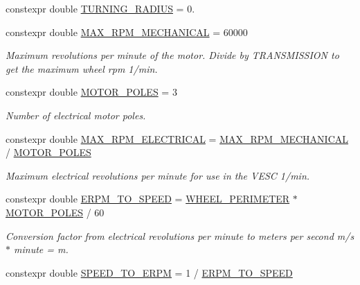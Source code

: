 \begin{DoxyCompactItemize}
\item 
constexpr double \hyperlink{namespacecar__config_afe308ba7ae07f7bd5af7e79a095101a9}{T\+U\+R\+N\+I\+N\+G\+\_\+\+R\+A\+D\+I\+US} = 0.
\item 
constexpr double \hyperlink{namespacecar__config_ad35069a183782259c6280aa219b72ffa}{M\+A\+X\+\_\+\+R\+P\+M\+\_\+\+M\+E\+C\+H\+A\+N\+I\+C\+AL} = 60000
\begin{DoxyCompactList}\small\item\em Maximum revolutions per minute of the motor. Divide by T\+R\+A\+N\+S\+M\+I\+S\+S\+I\+ON to get the maximum wheel rpm  1/min. \end{DoxyCompactList}\item 
constexpr double \hyperlink{namespacecar__config_a611a0f02cf52db1d438a2dd53b642cd5}{M\+O\+T\+O\+R\+\_\+\+P\+O\+L\+ES} = 3
\begin{DoxyCompactList}\small\item\em Number of electrical motor poles. \end{DoxyCompactList}\item 
constexpr double \hyperlink{namespacecar__config_aaf4d6a90e2b9c983b0b0d29a584c399b}{M\+A\+X\+\_\+\+R\+P\+M\+\_\+\+E\+L\+E\+C\+T\+R\+I\+C\+AL} = \hyperlink{namespacecar__config_ad35069a183782259c6280aa219b72ffa}{M\+A\+X\+\_\+\+R\+P\+M\+\_\+\+M\+E\+C\+H\+A\+N\+I\+C\+AL} / \hyperlink{namespacecar__config_a611a0f02cf52db1d438a2dd53b642cd5}{M\+O\+T\+O\+R\+\_\+\+P\+O\+L\+ES}
\begin{DoxyCompactList}\small\item\em Maximum electrical revolutions per minute for use in the V\+E\+SC  1/min. \end{DoxyCompactList}\item 
constexpr double \hyperlink{namespacecar__config_af33b95798967e7193927782fd91d36ce}{E\+R\+P\+M\+\_\+\+T\+O\+\_\+\+S\+P\+E\+ED} = \hyperlink{namespacecar__config_a46fe00906da07d2e030b586a634cd907}{W\+H\+E\+E\+L\+\_\+\+P\+E\+R\+I\+M\+E\+T\+ER} $\ast$ \hyperlink{namespacecar__config_a611a0f02cf52db1d438a2dd53b642cd5}{M\+O\+T\+O\+R\+\_\+\+P\+O\+L\+ES} / 60
\begin{DoxyCompactList}\small\item\em Conversion factor from electrical revolutions per minute to meters per second  m/s $\ast$ minute = m. \end{DoxyCompactList}\item 
constexpr double \hyperlink{namespacecar__config_a0f37aa7e52366aebb006c6e1d3317900}{S\+P\+E\+E\+D\+\_\+\+T\+O\+\_\+\+E\+R\+PM} = 1 / \hyperlink{namespacecar__config_af33b95798967e7193927782fd91d36ce}{E\+R\+P\+M\+\_\+\+T\+O\+\_\+\+S\+P\+E\+ED}

\end{DoxyCompactItemize}

